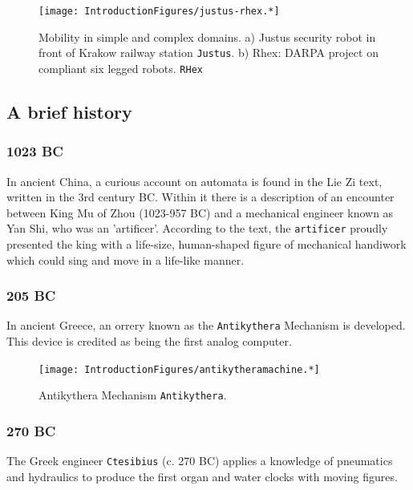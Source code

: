 \begin{figure}
\centering
\texttt{[image: IntroductionFigures/justus-rhex.*]}
\caption{Mobility in simple and complex domains. a) Justus security
robot in front of Krakow railway station \texttt{Justus}. b) Rhex: DARPA
project on compliant six legged robots. \texttt{RHex}}
\end{figure}

\hypertarget{a-brief-history}{%
\subsection{A brief history}\label{a-brief-history}}

\hypertarget{bc}{%
\subsubsection{1023 BC}\label{bc}}

In ancient China, a curious account on automata is found in the Lie Zi
text, written in the 3rd century BC. Within it there is a description of
an encounter between King Mu of Zhou (1023-957 BC) and a mechanical
engineer known as Yan Shi, who was an 'artificer'. According to the
text, the \texttt{artificer} proudly presented the king with a
life-size, human-shaped figure of mechanical handiwork which could sing
and move in a life-like manner.

\hypertarget{bc-1}{%
\subsubsection{205 BC}\label{bc-1}}

In ancient Greece, an orrery known as the \texttt{Antikythera} Mechanism
is developed. This device is credited as being the first analog
computer.

\begin{figure}
\centering
\texttt{[image: IntroductionFigures/antikytheramachine.*]}
\caption{Antikythera Mechanism \texttt{Antikythera}.}
\end{figure}

\hypertarget{bc-2}{%
\subsubsection{270 BC}\label{bc-2}}

The Greek engineer \texttt{Ctesibius} (c. 270 BC) applies a knowledge of
pneumatics and hydraulics to produce the first organ and water clocks
with moving figures.

